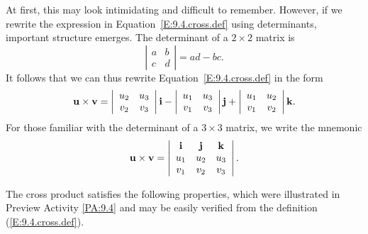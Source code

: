 At first, this may look intimidating and difficult
to remember.  However, if we rewrite the expression in Equation~\eqref{E:9.4.cross.def} using determinants, 
important structure emerges.  The determinant of a $2\times2$ matrix is
$$
\left|
  \begin{array}{cc}
    a & b \\
    c & d 
  \end{array}
\right|
=ad - bc.$$
It follows that we can thus rewrite Equation~\eqref{E:9.4.cross.def} in the form
$$
\mathbf{u}\times\mathbf{v} = 
\left|
  \begin{array}{cc}
    u_2 & u_3 \\
    v_2 & v_3 \\
  \end{array}
\right| \mathbf{i}
-
\left|
  \begin{array}{cc}
    u_1 & u_3 \\
    v_1 & v_3 \\
  \end{array}
\right| \mathbf{j}
+
\left|
  \begin{array}{cc}
    u_1 & u_2 \\
    v_1 & v_2 \\
  \end{array}
\right| \mathbf{k}.
$$
For those familiar with the determinant of a $3\times3$ matrix, we
write the mnemonic
$$
\mathbf{u}\times\mathbf{v} = 
\left|
  \begin{array}{ccc}
    \mathbf{i} & \mathbf{j} & \mathbf{k} \\
    u_1 & u_2 & u_3 \\
    v_1 & v_2 & v_3
  \end{array}
\right|.
$$

\newpage


The cross product satisfies the following properties, which were
illustrated in Preview Activity \ref{PA:9.4} and may be easily
verified from the definition (\ref{E:9.4.cross.def}).

\vspace*{5pt}
\nin 
{}
\vspace*{5pt}

